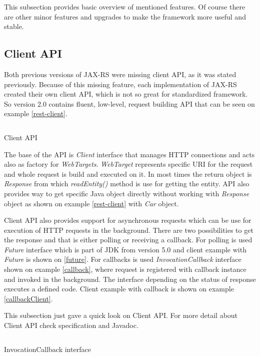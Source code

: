 \documentclass[12pt,final,oneside]{fithesis2}
\begin{document}
This subsection provides basic overview of mentioned features. Of course there are other minor features and upgrades to make the framework more useful and stable.

\subsection*{Client API}
Both previous versions of JAX-RS were missing client API, as it was stated previously. Because of this missing feature, each implementation of JAX-RS created their own client API, which is not so great for standardized framework. So version 2.0 contains fluent, low-level, request building API that can be seen on example \ref{rest-client}. 

\begin{listing}[ht]
	\inputminted[]{java}{sources/client.java}
	\caption{Client API}
	\label{rest-client}
\end{listing}

The base of the API is \textit{Client} interface that manages HTTP connections and acts also as factory for \textit{WebTargets}. \textit{WebTarget} represents specific URI for the request and whole request is build and executed on it. In most times the return object is \textit{Response} from which \textit{readEntity()} method is use for getting the entity. API also provides way to get specific Java object directly without working with \textit{Response} object as shown on example \ref{rest-client} with \textit{Car} object.

Client API also provides support for asynchronous requests which can be use for execution of HTTP requests in the background. There are two possibilities to get the response and that is either polling or receiving a callback. For polling is used \textit{Future} interface which is part of JDK from version 5.0 and client example with \textit{Future} is shown on \ref{future}. For callbacks is used \textit{InvocationCallback} interface shown on example \ref{callback}, where request is registered with callback instance and invoked in the background. The interface depending on the status of response executes a defined code\cite{jax-rs-2.0-new}\cite{jax-rs-2.0}. Client example with callback is shown on example \ref{callbackClient}.

This subsection just gave a quick look on Client API. For more detail about Client API check specification and Javadoc.

\begin{listing}[ht]
	\inputminted[]{java}{sources/callback.java}
	\caption{InvocationCallback interface}
	\label{callback}
\end{listing}
\end{document}
